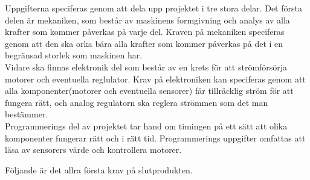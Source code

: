 Uppgifterna speciferas genom att dela upp projektet i tre stora delar. Det första delen är mekaniken, som består av maskinens formgivning och analys av alla krafter som kommer påverkas på varje del. Kraven på mekaniken speciferas genom att den ska orka bära alla krafter som kommer påverkas på det i en begränsad storlek som maskinen har.\\

Vidare ska finnas elektronik del som består av en krets för att strömförsörja motorer och eventuella reglulator. Krav på elektroniken kan speciferas genom att alla komponenter(motorer och eventuella sensorer) får tillräcklig ström för att fungera rätt, och analog regulatorn ska reglera strömmen som det man bestämmer.\\

Programmerings del av projektet tar hand om timingen på ett sätt att olika komponenter fungerar rätt och i rätt tid. Programmerings uppgifter omfattas att läsa av sensorers värde och kontrollera motorer.

Följande är det allra första krav på slutprodukten.


